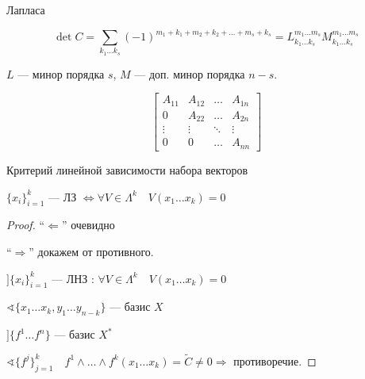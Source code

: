 \begin{theorem}
    Лапласа

    \[\det C = \sum\limits_{k_1\ldots k_s} (-1)^{m_1+k_1+m_2+k_2+\ldots+m_s+k_s}=L^{m_1\ldots m_s}_{k_1\ldots k_s} M^{m_1\ldots m_s}_{k_1\ldots k_s}\]

    \(L\) --- минор порядка \(s\), \(M\) --- доп. минор порядка \(n-s\).
\end{theorem}

\begin{consequence}
    \[\begin{bmatrix}
        A_{11} & A_{12} & \ldots & A_{1n} \\
        0 & A_{22} & \ldots & A_{2n} \\
        \vdots & \vdots & \ddots & \vdots \\
        0 & 0 & \ldots & A_{nn}
    \end{bmatrix}\]
\end{consequence}

\begin{theorem}
    Критерий линейной зависимости набора векторов

    \(\{x_i\}_{i=1}^k\) --- ЛЗ \(\Leftrightarrow \forall V\in \Lambda^k \quad V(x_1\ldots x_k)=0\)
\end{theorem}
\begin{proof}
    ``\(\Leftarrow\)'' очевидно

    ``\(\Rightarrow\)'' докажем от противного.

    \(] \{x_i\}_{i=1}^k\) --- ЛНЗ : \(\forall V\in \Lambda^k \quad V(x_1\ldots x_k)=0\)

    \(\sphericalangle \{x_1\ldots x_k, y_1\ldots y_{n-k}\}\) --- базис \(X\)

    \(] \{f^1\ldots f^n\}\) --- базис \(X^*\)

    \(\sphericalangle \{f^j\}_{j=1}^k\quad f^1\wedge\ldots\wedge f^k(x_1\ldots x_k)=\tilde C\not=0\Rightarrow \) противоречие.
\end{proof}


